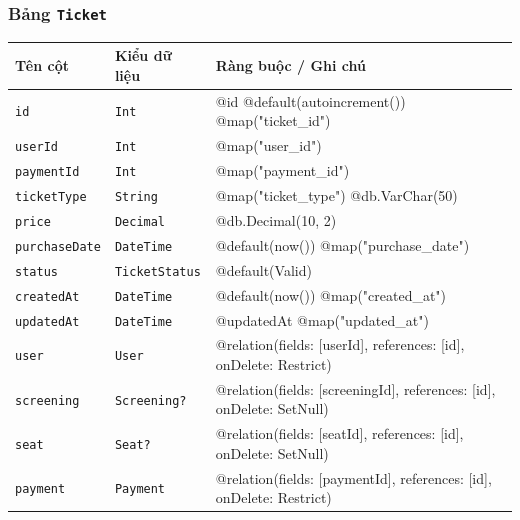 \subsubsection{Bảng \texttt{Ticket}}
\begin{longtable}{|p{3.6cm}|p{3.0cm}|p{8.9cm}|}
\hline
\rowcolor{headerblue} \textbf{Tên cột} & \textbf{Kiểu dữ liệu} & \textbf{Ràng buộc / Ghi chú} \\ \hline
\endhead
\texttt{id} & \texttt{Int} & \small @id @default(autoincrement()) @map("ticket\_id") \\ \hline
\texttt{userId} & \texttt{Int} & \small @map("user\_id") \\ \hline
\texttt{paymentId} & \texttt{Int} & \small @map("payment\_id") \\ \hline
\texttt{ticketType} & \texttt{String} & \small @map("ticket\_type") @db.VarChar(50) \\ \hline
\texttt{price} & \texttt{Decimal} & \small @db.Decimal(10, 2) \\ \hline
\texttt{purchaseDate} & \texttt{DateTime} & \small @default(now()) @map("purchase\_date") \\ \hline
\texttt{status} & \texttt{TicketStatus} & \small @default(Valid) \\ \hline
\texttt{createdAt} & \texttt{DateTime} & \small @default(now()) @map("created\_at") \\ \hline
\texttt{updatedAt} & \texttt{DateTime} & \small @updatedAt @map("updated\_at") \\ \hline
\texttt{user} & \texttt{User} & \small @relation(fields: [userId], references: [id], onDelete: Restrict) \\ \hline
\texttt{screening} & \texttt{Screening?} & \small @relation(fields: [screeningId], references: [id], onDelete: SetNull) \\ \hline
\texttt{seat} & \texttt{Seat?} & \small @relation(fields: [seatId], references: [id], onDelete: SetNull) \\ \hline
\texttt{payment} & \texttt{Payment} & \small @relation(fields: [paymentId], references: [id], onDelete: Restrict) \\ \hline
\end{longtable}


